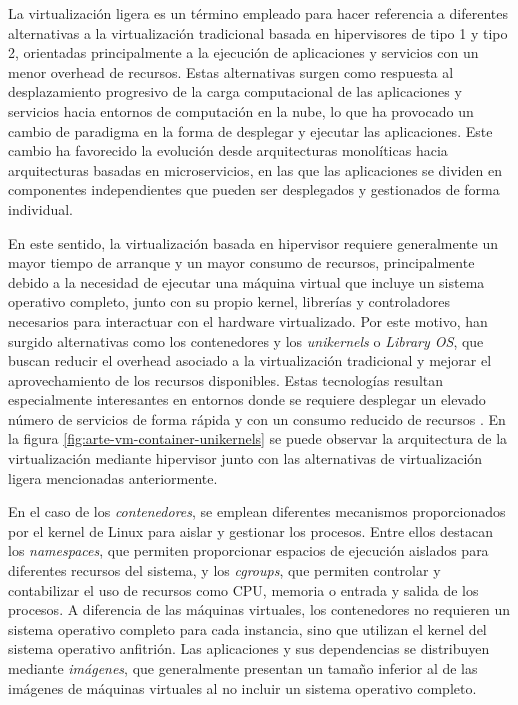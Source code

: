  La virtualización ligera es un término empleado para hacer referencia a diferentes alternativas a la virtualización tradicional basada en hipervisores de tipo 1 y tipo 2, orientadas principalmente a la ejecución de aplicaciones y servicios con un menor overhead de recursos. Estas alternativas surgen como respuesta al desplazamiento progresivo de la carga computacional de las aplicaciones y servicios hacia entornos de computación en la nube, lo que ha provocado un cambio de paradigma en la forma de desplegar y ejecutar las aplicaciones. Este cambio ha favorecido la evolución desde arquitecturas monolíticas hacia arquitecturas basadas en microservicios, en las que las aplicaciones se dividen en componentes independientes que pueden ser desplegados y gestionados de forma individual.

 En este sentido, la virtualización basada en hipervisor requiere generalmente un mayor tiempo de arranque y un mayor consumo de recursos, principalmente debido a la necesidad de ejecutar una máquina virtual que incluye un sistema operativo completo, junto con su propio kernel, librerías y controladores necesarios para interactuar con el hardware virtualizado. Por este motivo, han surgido alternativas como los contenedores y los \textit{unikernels} o \textit{Library OS}, que buscan reducir el overhead asociado a la virtualización tradicional y mejorar el aprovechamiento de los recursos disponibles. Estas tecnologías resultan especialmente interesantes en entornos donde se requiere desplegar un elevado número de servicios de forma rápida y con un consumo reducido de recursos \cite{vm-vs-docker-unikernels}. En la figura \ref{fig:arte-vm-container-unikernels} se puede observar la arquitectura de la virtualización mediante hipervisor junto con las alternativas de virtualización ligera mencionadas anteriormente.  

 En el caso de los \textit{contenedores}, se emplean diferentes mecanismos proporcionados por el kernel de Linux para aislar y gestionar los procesos. Entre ellos destacan los \textit{namespaces}, que permiten proporcionar espacios de ejecución aislados para diferentes recursos del sistema, y los \textit{cgroups}, que permiten controlar y contabilizar el uso de recursos como CPU, memoria o entrada y salida de los procesos. A diferencia de las máquinas virtuales, los contenedores no requieren un sistema operativo completo para cada instancia, sino que utilizan el kernel del sistema operativo anfitrión. Las aplicaciones y sus dependencias se distribuyen mediante \textit{imágenes}, que generalmente presentan un tamaño inferior al de las imágenes de máquinas virtuales al no incluir un sistema operativo completo.

